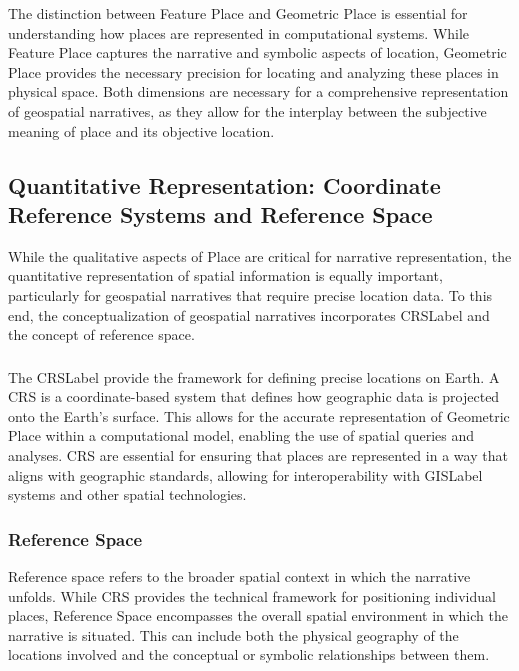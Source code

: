 The distinction between Feature Place and Geometric Place is essential for understanding how places are represented in computational systems. While Feature Place captures the narrative and symbolic aspects of location, Geometric Place provides the necessary precision for locating and analyzing these places in physical space. Both dimensions are necessary for a comprehensive representation of geospatial narratives, as they allow for the interplay between the subjective meaning of place and its objective location.

\subsection{Quantitative Representation: Coordinate Reference Systems and Reference Space}\label{V-subsec:quantitative-representation}
While the qualitative aspects of Place are critical for narrative representation, the quantitative representation of spatial information is equally important, particularly for geospatial narratives that require precise location data. To this end, the conceptualization of geospatial narratives incorporates \acrshort{CRSLabel} and the concept of reference space.

\subsubsection{}\label{V-subsec:crs
}
The \acrshort{CRSLabel} provide the framework for defining precise locations on Earth. A CRS is a coordinate-based system that defines how geographic data is projected onto the Earth's surface. This allows for the accurate representation of Geometric Place within a computational model, enabling the use of spatial queries and analyses. CRS are essential for ensuring that places are represented in a way that aligns with geographic standards, allowing for interoperability with \acrshort{GISLabel} systems and other spatial technologies.

\subsubsection{Reference Space}\label{V-subsec:referenceSpace}
Reference space refers to the broader spatial context in which the narrative unfolds. While CRS provides the technical framework for positioning individual places, Reference Space encompasses the overall spatial environment in which the narrative is situated. This can include both the physical geography of the locations involved and the conceptual or symbolic relationships between them.

